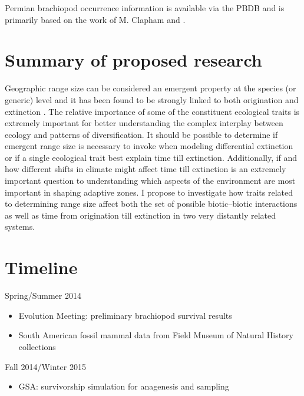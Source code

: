 \documentclass[12pt,letterpaper]{article}
\begin{document}
Permian brachiopod occurrence information is available via the PBDB and is primarily based on the work of M. Clapham \citep{Clapham2006,Clapham2008a,Clapham2007a,Clapham2012,Clapham2007} and \citet{Waterhouse1987}.


\section{Summary of proposed research}
Geographic range size can be considered an emergent property at the species (or generic) level and it has been found to be strongly linked to both origination and extinction \citep{Roy2009c,Jablonski2003,Jablonski2006a}. The relative importance of some of the constituent ecological traits is extremely important for better understanding the complex interplay between ecology and patterns of diversification. It should be possible to determine if emergent range size is necessary to invoke when modeling differential extinction or if a single ecological trait best explain time till extinction. Additionally, if and how different shifts in climate might affect time till extinction is an extremely important question to understanding which aspects of the environment are most important in shaping adaptive zones. I propose to investigate how traits related to determining range size affect both the set of possible biotic--biotic interactions as well as time from origination till extinction in two very distantly related systems.


\clearpage
\section{Timeline}

Spring/Summer 2014
\begin{itemize}
  \item Evolution Meeting: preliminary brachiopod survival results
  \item South American fossil mammal data from Field Museum of Natural History collections
\end{itemize}

Fall 2014/Winter 2015
\begin{itemize}
  \item GSA: survivorship simulation for anagenesis and sampling
\end{itemize}
\end{document}
